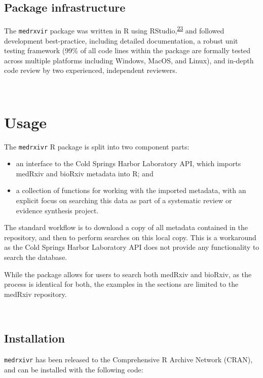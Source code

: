 \documentclass[a4paper, twoside]{templates/ociamthesis}
\providecommand{\tightlist}{%
  \setlength{\itemsep}{0pt}\setlength{\parskip}{0pt}}
\begin{document}
\hypertarget{package-infrastructure}{%
\subsection{Package infrastructure}\label{package-infrastructure}}

The \texttt{medrxvir} package was written in R using RStudio,\textsuperscript{\protect\hyperlink{ref-rcoreteam2019}{23}} and followed development best-practice, including detailed documentation, a robust unit testing framework (99\% of all code lines within the package are formally tested across multiple platforms including Windows, MacOS, and Linux), and in-depth code review by two experienced, independent reviewers.

~

\hypertarget{usage}{%
\section{Usage}\label{usage}}

The \texttt{medrxivr} R package is split into two component parts:

\begin{itemize}
\tightlist
\item
  an interface to the Cold Springs Harbor Laboratory API, which imports medRxiv and bioRxiv metadata into R; and
\item
  a collection of functions for working with the imported metadata, with an explicit focus on searching this data as part of a systematic review or evidence synthesis project.
\end{itemize}

The standard workflow is to download a copy of all metadata contained in the repository, and then to perform searches on this local copy. This is a workaround as the Cold Springs Harbor Laboratory API does not provide any functionality to search the database.

While the package allows for users to search both medRxiv and bioRxiv, as the process is identical for both, the examples in the sections are limited to the medRxiv repository.

~

\hypertarget{installation}{%
\subsection{Installation}\label{installation}}

\texttt{medrxivr} has been released to the Comprehensive R Archive Network (CRAN), and can be installed with the following code:
\end{document}
